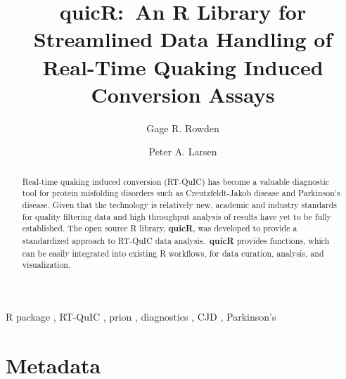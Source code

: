 \documentclass[preprint,12pt,a4paper]{elsarticle}
\begin{document}
    \renewcommand{\labelenumii}{\arabic{enumi}.\arabic{enumii}}

    \begin{frontmatter}

        \title{\textbf{quicR}:\ An R Library for Streamlined Data Handling of Real-Time Quaking Induced Conversion Assays}
        \author[label1,label2,label3]{Gage R. Rowden}
        \author[label1,label2,label3]{Peter A. Larsen}
        \address[label1]{Department of Veterinary and Biomedical Sciences, University of Minnesota, USA.}
        \address[label2]{Minnesota Center for Prion Research and Outreach, University of Minnesota, USA.}
        \address[label3]{Priogen Corp., USA.}

        \begin{abstract}
            Real-time quaking induced conversion (RT-QuIC) has become a valuable diagnostic tool for protein misfolding disorders such as Creutzfeldt-Jakob disease and Parkinson's disease. Given that the technology is relatively new, academic and industry standards for quality filtering data and high throughput analysis of results have yet to be fully established. The open source R library, \textbf{quicR}, was developed to provide a standardized approach to RT-QuIC data analysis.\ \textbf{quicR} provides functions, which can be easily integrated into existing R workflows, for data curation, analysis, and visualization.
        \end{abstract}

        \begin{keyword}
            R package \sep{} RT-QuIC \sep{} prion \sep{} diagnostics \sep{} CJD \sep{} Parkinson's
        \end{keyword}

    \end{frontmatter}


    \section*{Metadata}
\end{document}
